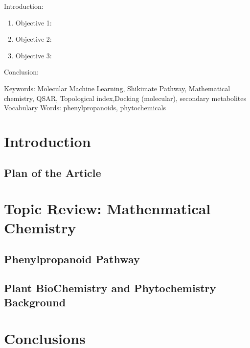 

\twocolumn
\scriptsize
\begin{frontmatter}
		\title{}
		\author{}
		\address{The Mathematical Learning Space}
\end{frontmatter}	

Introduction:
\begin{enumerate}
\item Objective 1:
\item Objective 2:
\item Objective 3:
\end{enumerate}
Conclusion:

Keywords:  Molecular Machine Learning, Shikimate Pathway, Mathematical chemistry, QSAR, Topological index,Docking (molecular), secondary  metabolites
Vocabulary Words: phenylpropanoids, phytochemicals

\section{Introduction}


\subsection{Plan of the Article}

\section{Topic Review: Mathenmatical Chemistry}

\subsection{Phenylpropanoid Pathway}


\subsection{Plant BioChemistry and Phytochemistry Background}


\section{Conclusions}


